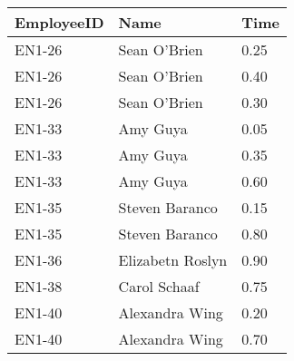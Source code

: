 \documentclass{article}
\begin{document}
\begin{tabular}{|p{0.6in}|p{0.7in}|p{0.6in}|} \hline 
EmployeeID & Name & Time \\ \hline 
EN1-26 & Sean O'Brien & 0.25 \\ \hline 
EN1-26 & Sean O'Brien & 0.40 \\ \hline 
EN1-26 & Sean O'Brien & 0.30 \\ \hline 
EN1-33 & Amy Guya & 0.05 \\ \hline 
EN1-33 & Amy Guya & 0.35 \\ \hline 
EN1-33 & Amy Guya & 0.60 \\ \hline 
EN1-35 & Steven Baranco & 0.15 \\ \hline 
EN1-35 & Steven Baranco & 0.80 \\ \hline 
EN1-36 & Elizabetn Roslyn & 0.90 \\ \hline 
EN1-38 & Carol Schaaf & 0.75 \\ \hline 
EN1-40 & Alexandra Wing & 0.20 \\ \hline 
EN1-40 & Alexandra Wing & 0.70 \\ \hline 
\end{tabular}



\noindent 
\end{document}
